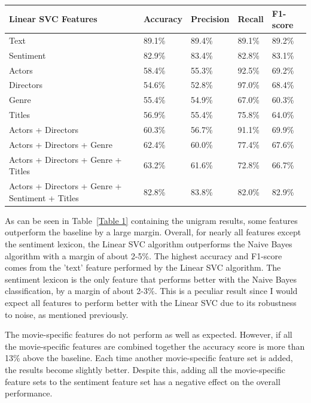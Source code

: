 \documentclass[
10pt, %
a4paper, %
oneside, %
headinclude,footinclude, %
] {book}%
\begin{document}
\begin{table}[hbtp]
\begin{tabular}{@{}lllll@{}}
\toprule
Linear SVC Features                          & Accuracy & Precision & Recall & F1-score \\ \midrule
Text                              & 89.1\%       & 89.4\%          & 89.1\%       & 89.2\%         \\
Sentiment                         & 82.9\%         & 83.4\%          & 82.8\%       & 83.1\%         \\
Actors                            & 58.4\%         & 55.3\%          & 92.5\%       & 69.2\%         \\
Directors                         & 54.6\%         & 52.8\%          & 97.0\%       & 68.4\%         \\
Genre                             & 55.4\%         & 54.9\%          & 67.0\%       & 60.3\%         \\
Titles                            & 56.9\%         & 55.4\%          & 75.8\%       & 64.0\%         \\
Actors + Directors                        & 60.3\%         & 56.7\%          & 91.1\%       & 69.9\%         \\
Actors + Directors + Genre                        & 62.4\%         & 60.0\%          & 77.4\%       & 67.6\%         \\
Actors + Directors + Genre + Titles                       & 63.2\%         & 61.6\%          & 72.8\%       & 66.7\%         \\
Actors + Directors + Genre + Sentiment + Titles                    & 82.8\%         & 83.8\%          & 82.0\%       & 82.9\%         \\ \bottomrule
\end{tabular}
\end{table}

As can be seen in Table~\ref{Table 1} containing the unigram results, some features outperform the baseline by a large margin. Overall, for nearly all features except the sentiment lexicon, the Linear SVC algorithm outperforms the Naive Bayes algorithm with a margin of about 2-5\%. The highest accuracy and F1-score comes from the 'text' feature performed by the Linear SVC algorithm. The sentiment lexicon is the only feature that performs better with the Naive Bayes classification, by a margin of about 2-3\%. This is a peculiar result since I would expect all features to perform better with the Linear SVC due to its robustness to noise, as mentioned previously.

The movie-specific features do not perform as well as expected. However, if all the movie-specific features are combined together the accuracy score is more than 13\% above the baseline. Each time another movie-specific feature set is added, the results become slightly better. Despite this, adding all the movie-specific feature sets to the sentiment feature set has a negative effect on the overall performance.
\end{document}
